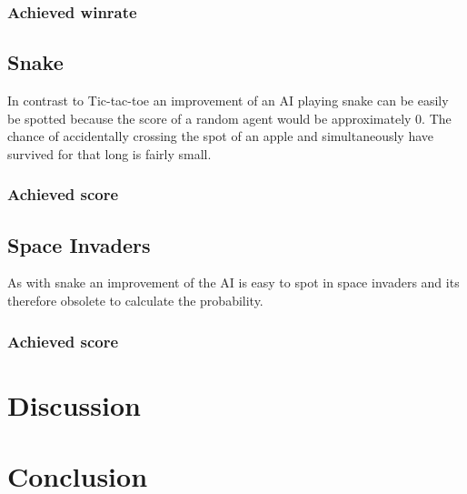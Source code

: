 \documentclass[12pt]{article}
\begin{document}
\subsubsection{Achieved winrate}
\subsection{Snake}
In contrast to Tic-tac-toe an improvement of an \gls{AI} playing snake can be easily be spotted because the score of a random agent would be approximately $0$. The chance of accidentally crossing the spot of an apple and simultaneously have survived for that long is fairly small.   
\subsubsection{Achieved score}
\subsection{Space Invaders}
As with snake an improvement of the \gls{AI} is easy to spot in space invaders and its therefore obsolete to calculate the probability. 
\subsubsection{Achieved score}
\section{Discussion}
\section{Conclusion}
\clearpage
\printglossaries

\newpage

\listoffigures
\end{document}
